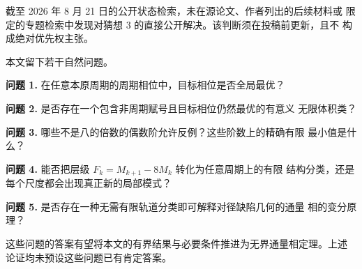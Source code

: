 截至 2026 年 8 月 21 日的公开状态检索，未在源论文、作者列出的后续材料或
限定的专题检索中发现对猜想 3 的直接公开解决。该判断须在投稿前更新，且不
构成绝对优先权主张。

本文留下若干自然问题。

\textbf{问题 1.} 在任意本原周期的周期相位中，目标相位是否全局最优？

\textbf{问题 2.} 是否存在一个包含非周期赋号且目标相位仍然最优的有意义
无限体积类？

\textbf{问题 3.} 哪些不是八的倍数的偶数阶允许反例？这些阶数上的精确有限
最小值是什么？

\textbf{问题 4.} 能否把层级 \(F_k=M_{k+1}-8M_k\) 转化为任意周期上的有限
结构分类，还是每个尺度都会出现真正新的局部模式？

\textbf{问题 5.} 是否存在一种无需有限轨道分类即可解释对径缺陷几何的通量
相的变分原理？

这些问题的答案有望将本文的有界结果与必要条件推进为无界通量相定理。上述
论证均未预设这些问题已有肯定答案。
